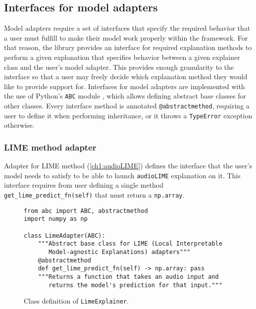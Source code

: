 \documentclass[
    bindingoffset=5mm,  %
    footnoteindent=3mm, %
    hyphenation=true    %
]{src/wut-thesis}
\begin{document}
\subsection{Interfaces for model adapters}

    Model adapters require a set of interfaces that specify the required behavior that a user
    must fulfill to make their model work properly within the framework. For that reason, the 
    library provides an interface for required explanation methods to perform a given 
    explanation that specifies behavior
    between a given explainer class and the user’s model adapter. This provides enough 
    granularity to the interface so that a user may freely decide which explanation method 
    they would like to provide support for.
    Interfaces for model adapters are implemented with the use of
    Python’s \texttt{ABC} module \cite{pythonABC}, which allows defining abstract 
    base classes for other classes. Every interface method is annotated 
    \texttt{@abstractmethod}, requiring a user to define it when performing inheritance, or it throws a \texttt{TypeError} exception otherwise.
    
\subsubsection{LIME method adapter}

    Adapter for LIME method (\ref{ch1:audioLIME}) defines the interface that the user's model needs to satisfy to be able to launch \texttt{audioLIME} explanation on it.
    This interface requires from user defining a single method \texttt{get_lime_predict_fn(self)}
    that must return a \texttt{np.array}.

\begin{figure}%
\begin{verbatim}
from abc import ABC, abstractmethod
import numpy as np

class LimeAdapter(ABC):
    """Abstract base class for LIME (Local Interpretable
       Model-agnostic Explanations) adapters"""
    @abstractmethod
    def get_lime_predict_fn(self) -> np.array: pass
    """Returns a function that takes an audio input and
       returns the model's prediction for that input."""
\end{verbatim}
\caption{Class definition of \texttt{LimeExplainer}.}
\label{fig:LimeAdapter}
\end{figure}
\end{document}
